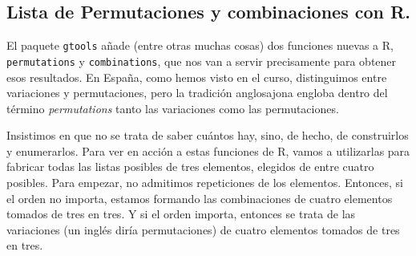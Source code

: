 \documentclass[10pt,a4paper]{article}\usepackage[]{graphicx}\usepackage[]{color}
\begin{document}
      \subsection{Lista de Permutaciones y combinaciones con R.}
      \label{tut03:subsec:PermutacionesCombinacionesR}
      
      El paquete {\tt gtools} añade (entre otras muchas cosas) dos funciones nuevas a R, {\tt permutations} y {\tt combinations}, que nos van a servir precisamente para obtener esos resultados. En España, como hemos visto en el curso, distinguimos entre variaciones y permutaciones, pero la tradición anglosajona engloba dentro del término {\em permutations} tanto las variaciones como las permutaciones.
      
      Insistimos en que no se trata de saber cuántos hay, sino, de hecho, de construirlos y enumerarlos. Para ver en acción a estas funciones de R, vamos a utilizarlas para fabricar todas las listas posibles de tres elementos, elegidos de entre cuatro posibles. Para empezar, no admitimos repeticiones de los elementos. Entonces, si el orden no importa, estamos formando las combinaciones de cuatro elementos tomados de tres en tres. Y si el orden importa, entonces se trata de las variaciones (un inglés diría permutaciones) de cuatro elementos tomados de tres en tres.
      
\end{document}
